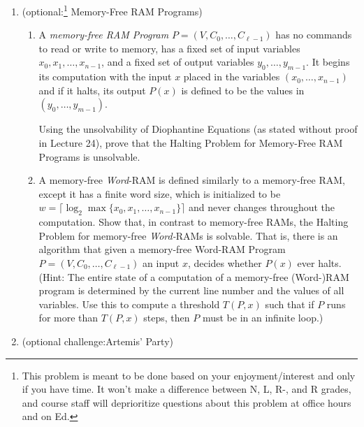 \documentclass[11pt]{article}
\begin{document}
\begin{enumerate}
\begin{enumerate}
    {A Word-RAM program $P$}
    {$\yes$ if $P$ has an arithmetic overflow when run on input $\eps$, $\no$ otherwise}
  \end{enumerate}

    \item (optional:\footnote{This problem is meant to be done based on your enjoyment/interest and only if you have time. It won't make a difference between N, L, R-, and R grades, and course staff will deprioritize questions about this problem at office hours and on Ed.}  Memory-Free RAM Programs) 

\begin{enumerate}
\item A {\em memory-free
RAM Program} $P=(V,C_0,\ldots,C_{\ell-1})$ has no commands to read or write to memory, has a fixed set of input variables $x_0,x_1,\ldots,x_{n-1}$, and a fixed set of output variables $y_0,\ldots,y_{m-1}$.  It begins its computation with the
input $x$ placed in the variables $(x_0,\ldots,x_{n-1})$ and if it halts, its output $P(x)$ is defined to be the values in $(y_0,\ldots,y_{m-1})$.

Using the unsolvability of Diophantine Equations (as stated without proof in Lecture 24), prove that the Halting Problem for Memory-Free RAM Programs is unsolvable.


        \item
        A memory-free {\em Word}-RAM is defined similarly to a memory-free RAM, except it has a finite word size, which is initialized to be
        $w=\lceil \log_2 \max\{x_0,x_1,\ldots,x_{n-1}\}\rceil$ and never changes throughout the computation.
        Show that, in contrast to memory-free RAMs, the Halting Problem for memory-free {\em Word-}RAMs is solvable.  That is, there is an algorithm that
    given a memory-free Word-RAM Program $P=(V,C_0,\ldots,C_{\ell-1})$ an input $x$, decides whether $P(x)$ ever halts.
    (Hint: The entire state of a computation of a memory-free (Word-)RAM program is determined by the current line number and the values of all variables. Use this to compute a threshold $T(P,x)$ such that if $P$ runs for more than $T(P,x)$ steps, then $P$ must be in an infinite loop.)
 
    \end{enumerate}

   
    \item (optional challenge:\footnotemark[\value{footnote}] Artemis' Party) 


\end{enumerate}
\end{document}
